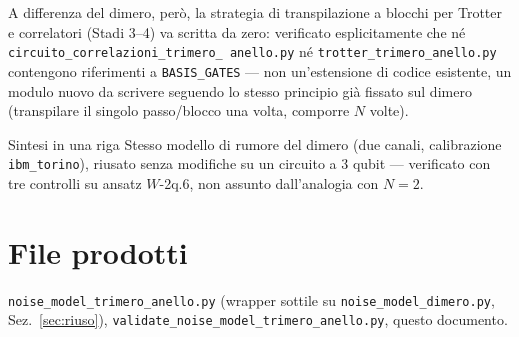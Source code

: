 \documentclass[11pt,a4paper]{article}
\begin{document}
A differenza del dimero, però, la strategia di transpilazione a blocchi
per Trotter e correlatori (Stadi 3--4) va scritta da zero: verificato
esplicitamente che né \texttt{circuito\_correlazioni\_trimero\_
anello.py} né \texttt{trotter\_trimero\_anello.py} contengono
riferimenti a \texttt{BASIS\_GATES} --- non un'estensione di codice
esistente, un modulo nuovo da scrivere seguendo lo stesso principio già
fissato sul dimero (transpilare il singolo passo/blocco una volta,
comporre $N$ volte).

\begin{okbox}{Sintesi in una riga}
Stesso modello di rumore del dimero (due canali, calibrazione
\texttt{ibm\_torino}), riusato senza modifiche su un circuito a 3 qubit
--- verificato con tre controlli su ansatz $W$-2q.6, non assunto
dall'analogia con $N=2$.
\end{okbox}

\section*{File prodotti}

\texttt{noise\_model\_trimero\_anello.py} (wrapper sottile su
\texttt{noise\_model\_dimero.py}, Sez.~\ref{sec:riuso}),
\texttt{validate\_noise\_model\_trimero\_anello.py}, questo documento.
\end{document}
